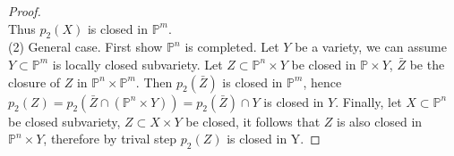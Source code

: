 \documentclass{amsart}
\theoremstyle{plain}
\theoremstyle{definition}
\theoremstyle{remark}
\numberwithin{equation}{section}
\begin{document}
\begin{proof}
\begin{equation*}
	\end{equation*}
	Thus $ p_2(X) $ is closed in $ \mathbb{P}^m $.\\
	(2) General case. First show $ \mathbb{P}^n $ is completed. Let $ Y $ be a variety, we can assume $ Y\subset \mathbb{P}^m $ is locally closed subvariety. Let $ Z\subset \mathbb{P}^n\times Y $ be closed in $ \mathbb{P}\times Y $, $ \bar{Z} $ be the closure of $ Z $ in $ \mathbb{P}^n\times\mathbb{P}^m $. Then $ p_2(\bar{Z}) $ is closed in $ \mathbb{P}^m $, hence $ p_2(Z)=p_2(\bar{Z}\cap (\mathbb{P}^n\times Y))=p_2(\bar{Z})\cap Y $ is closed in $ Y $. Finally, let $ X\subset \mathbb{P}^n $ be closed subvariety, $ Z\subset X\times Y $  be closed, it follows that $ Z $ is also closed in $ \mathbb{P}^n\times Y $, therefore by trival step $ p_2(Z) $ is closed in Y.
\end{proof}
\end{document}

